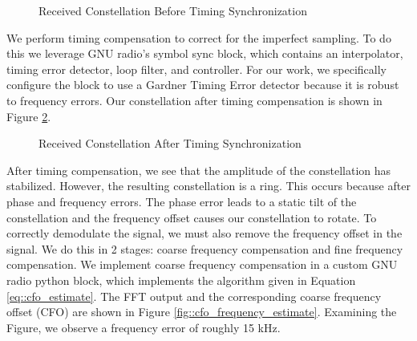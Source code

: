 \documentclass[conference,onecolumn]{IEEEtran}
\begin{document}
\begin{figure}[H]
	\centerline{}
	\caption{Received Constellation Before Timing Synchronization}
	\label{fig::constellation_no_timing_comp}
\end{figure}

\noindent We perform timing compensation to correct for the imperfect sampling. To do this we leverage GNU radio's symbol sync block, which contains an interpolator, timing error detector, loop filter, and controller. For our work, we specifically configure the block to use a Gardner Timing Error detector because it is robust to frequency errors. Our constellation after timing compensation is shown in Figure \ref{fig::constellation_after_timing_comp}.

\begin{figure}[H]
	\centerline{}
	\caption{Received Constellation After Timing Synchronization}
	\label{fig::constellation_after_timing_comp}
\end{figure}

After timing compensation, we see that the amplitude of the constellation has stabilized. However, the resulting constellation is a ring. This occurs because after phase and frequency errors. The phase error leads to a static tilt of the constellation and the frequency offset causes our constellation to rotate. To correctly demodulate the signal, we must also remove the frequency offset in the signal. We do this in 2 stages: coarse frequency compensation and fine frequency compensation. We implement coarse frequency compensation in a custom GNU radio python block, which implements the algorithm given in Equation \ref{eq::cfo_estimate}. The FFT output and the corresponding coarse frequency offset (CFO) are shown in Figure \ref{fig::cfo_frequency_estimate}. Examining the Figure, we observe a frequency error of roughly 15 kHz.
\end{document}
